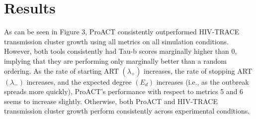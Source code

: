\documentclass[twocolumn]{bmcart}%
\begin{document}


\section*{Results}

As can be seen in Figure 3, ProACT consistently outperformed HIV-TRACE transmission cluster growth using all metrics on all simulation conditions. However, both tools consistently had Tau-b scores marginally higher than 0, implying that they are performing only marginally better than a random ordering.
As the rate of starting ART $\left(\lambda_+\right)$ increases, the rate of stopping ART $\left(\lambda_-\right)$ increases, and the expected degree $\left(E_d\right)$ increases (i.e., as the outbreak spreads more quickly), ProACT's performance with respect to metrics 5 and 6 seems to increase slightly. Otherwise, both ProACT and HIV-TRACE transmission cluster growth perform consistently across experimental conditions.
\end{document}
